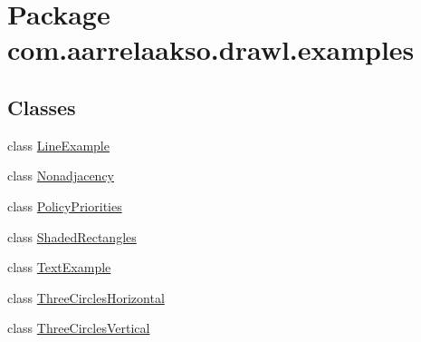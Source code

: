 \hypertarget{namespacecom_1_1aarrelaakso_1_1drawl_1_1examples}{}\section{Package com.\+aarrelaakso.\+drawl.\+examples}
\label{namespacecom_1_1aarrelaakso_1_1drawl_1_1examples}
\subsection*{Classes}
\begin{DoxyCompactItemize}
\item 
class \hyperlink{classcom_1_1aarrelaakso_1_1drawl_1_1examples_1_1_line_example}{Line\+Example}
\item 
class \hyperlink{classcom_1_1aarrelaakso_1_1drawl_1_1examples_1_1_nonadjacency}{Nonadjacency}
\item 
class \hyperlink{classcom_1_1aarrelaakso_1_1drawl_1_1examples_1_1_policy_priorities}{Policy\+Priorities}
\item 
class \hyperlink{classcom_1_1aarrelaakso_1_1drawl_1_1examples_1_1_shaded_rectangles}{Shaded\+Rectangles}
\item 
class \hyperlink{classcom_1_1aarrelaakso_1_1drawl_1_1examples_1_1_text_example}{Text\+Example}
\item 
class \hyperlink{classcom_1_1aarrelaakso_1_1drawl_1_1examples_1_1_three_circles_horizontal}{Three\+Circles\+Horizontal}
\item 
class \hyperlink{classcom_1_1aarrelaakso_1_1drawl_1_1examples_1_1_three_circles_vertical}{Three\+Circles\+Vertical}
\end{DoxyCompactItemize}
